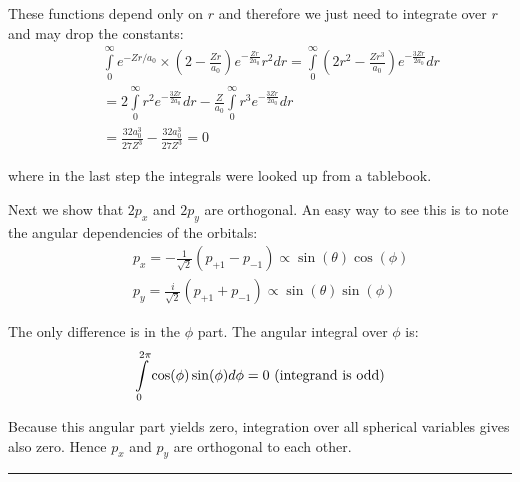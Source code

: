 \begin{enumerate}
These functions depend only on $r$ and therefore we just need to integrate over $r$ and may drop the constants:
\begin{eqnarray}
\nonumber
& & \int\limits_0^{\infty} e^{-Zr/a_0}\times\left(2 - \frac{Zr}{a_0}\right)e^{-\frac{Zr}{2a_0}}r^2dr = \int\limits_0^{\infty}\left(2r^2 - \frac{Zr^3}{a_0}\right)e^{-\frac{3Zr}{2a_0}}dr\\
\nonumber
& & = 2\int\limits_0^{\infty}r^2e^{-\frac{3Zr}{2a_0}}dr - \frac{Z}{a_0}\int\limits_0^{\infty}r^3e^{-\frac{3Zr}{2a_0}}dr\\
\nonumber
& & = \frac{32a_0^3}{27Z^3} - \frac{32a_0^3}{27Z^3} = 0
\end{eqnarray}

where in the last step the integrals were looked up from a tablebook.

Next we show that $2p_x$ and $2p_y$ are orthogonal. An easy way to see this is to note the angular dependencies of the orbitals:
\begin{eqnarray}
\nonumber
& & p_x = -\frac{1}{\sqrt{2}}\left(p_{+1} - p_{-1}\right)\propto \sin(\theta)\cos(\phi)\\
\nonumber
& & p_y = \frac{i}{\sqrt{2}}\left(p_{+1} + p_{-1}\right)\propto \sin(\theta)\sin(\phi)
\end{eqnarray}

The only difference is in the $\phi$ part. The angular integral over $\phi$ is:
$$\int\limits_0^{2\pi}\cos(\phi)\sin(\phi)d\phi = 0\textnormal{ (integrand is odd)}$$

Because this angular part yields zero, integration over all spherical variables gives also zero. Hence $p_x$ and $p_y$ are orthogonal to each other.

\end{enumerate}

\hrule\vspace{0.5cm}
